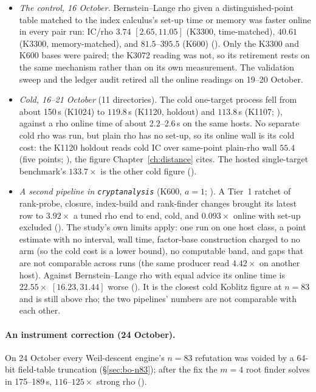 \begin{itemize}
  ), all against a rho with no
  table and with set-up excluded.
\item \emph{The control, 16 October.} Bernstein--Lange rho given a
  distinguished-point table matched to the index calculus's set-up time or
  memory was faster online in every pair run: IC/rho $3.74$
  $[2.65,11.05]$ (K3300, time-matched), $40.61$ (K3300, memory-matched),
  and $81.5$--$395.5$ (K600)
  (). Only the K3300 and
  K600 bases were paired; the K3072 reading was not, so its retirement rests
  on the same mechanism rather than on its own measurement. The validation
  sweep and the ledger audit retired all the online readings on 19--20
  October.
\item \emph{Cold, 16--21 October} (11 directories). The cold one-target
  process fell from about 150\,s (K1024) to $119.8$\,s (K1120, holdout) and
  $113.8$\,s (K1107; ), against
  a rho online time of about 2.2--2.6\,s on the same hosts. No separate
  cold rho was run, but plain rho has no set-up, so its online wall is its
  cold cost: the K1120 holdout reads cold IC over same-point plain-rho wall
  $55.4$ (five points; ),
  the figure Chapter~\ref{ch:distance} cites. The hosted single-target
  benchmark's $133.7\times$ is the other cold figure
  ().
\item \emph{A second pipeline in \texttt{cryptanalysis}} (K600, $a=1$;
  \cite{icprogram2026}). A Tier~1 ratchet of rank-probe, closure,
  index-build and rank-finder changes brought its latest row to $3.92\times$
  a tuned rho end to end, cold, and $0.093\times$ online with set-up
  excluded ().
  The study's own limits apply: one run on one host class, a point estimate
  with no interval, wall time, factor-base construction charged to no arm (so
  the cold cost is a lower bound), no computable band, and gaps that are not
  comparable across runs (the same producer read $4.42\times$ on another host).
  Against Bernstein--Lange rho with equal advice its online time is
  $22.55\times$ $[16.23,31.44]$ worse
  (). It is the
  closest cold Koblitz figure at $n=83$ and is still above rho; the two
  pipelines' numbers are not comparable with each other.
\end{itemize}
\paragraph{An instrument correction (24 October).} On 24 October every
Weil-descent engine's $n=83$ refutation was voided by a 64-bit field-table
truncation (\S\ref{sec:bo-n83}); after the fix the $m=4$ root finder solves
in 175--189\,s, $116$--$125\times$ strong rho
().

